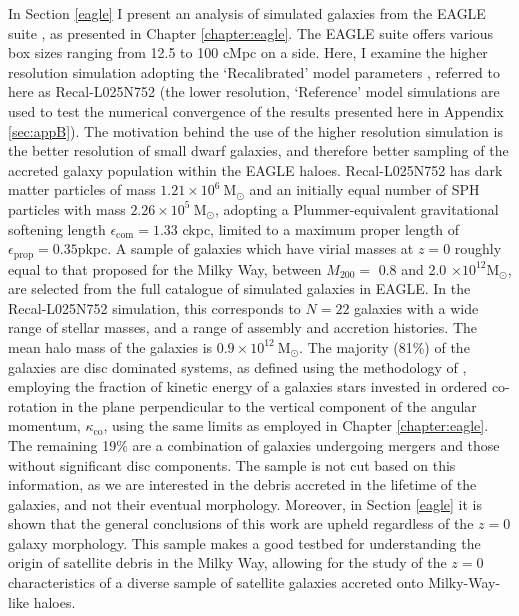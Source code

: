 In Section \ref{eagle} I present an analysis of simulated
galaxies from the EAGLE suite
\citep{2015MNRAS.446..521S,2015MNRAS.450.1937C}, as presented in Chapter \ref{chapter:eagle}.  The EAGLE suite offers various box sizes ranging from 12.5 to 100 cMpc on a side. Here, I examine the higher resolution simulation
adopting the `Recalibrated' model parameters
\citep[see][]{2015MNRAS.446..521S}, referred to here as Recal-L025N752
(the lower resolution, `Reference' model simulations are used to test
the numerical convergence of the results presented here in Appendix \ref{sec:appB}).
The motivation behind the use of the higher resolution simulation
is the better resolution of small dwarf galaxies, and therefore
better sampling of the accreted galaxy population within the EAGLE
haloes. Recal-L025N752 has dark matter particles of mass $1.21\times
10^{6}\ \mathrm{M_{\odot}}$ and an initially equal number of SPH
particles with mass $2.26\times 10^{5}\ \mathrm{M_{\odot}}$, adopting
a Plummer-equivalent gravitational softening length
$\epsilon_\mathrm{com}=1.33$ ckpc, limited to a maximum proper
length of $\epsilon_\mathrm{prop}=0.35$pkpc. A sample of
galaxies which have virial masses at $z=0$ roughly equal
to that proposed for the Milky Way, between $M_{200} = $ 0.8 and
2.0 $ \times 10^{12}\mathrm{M_{\odot}}$, are selected from the full catalogue of simulated galaxies in EAGLE.
In the Recal-L025N752 simulation, this corresponds to $N=22$ galaxies
with a wide range of stellar masses, and a range of assembly and
accretion histories.  The mean halo mass of the galaxies is
$0.9\times10^{12}\ \mathrm{M_\odot}$.  The majority (81\%) of the
galaxies are disc dominated systems, as defined using the methodology
of \citet{2017arXiv170406283C}, employing the fraction of
kinetic energy of a galaxies stars invested in ordered co-rotation
in the plane perpendicular to the vertical component of
the angular momentum, $\kappa_{\mathrm{co}}$, using the same limits as employed in Chapter \ref{chapter:eagle}.
The remaining 19\% are a combination of galaxies undergoing mergers
and those without significant disc components. The sample is not cut based on this information, as we are interested in the debris
accreted in the lifetime of the galaxies, and not their eventual
morphology. Moreover, in Section \ref{eagle} it is shown that
the general conclusions of this work are upheld regardless of the $z=0$ galaxy
morphology.  This sample makes a good testbed for understanding the
origin of satellite debris in the Milky Way, allowing for the study of
the $z=0$ characteristics of a diverse sample of satellite galaxies
accreted onto Milky-Way-like haloes.

